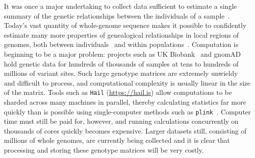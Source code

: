 \documentclass{article}
\begin{document}
It was once a major undertaking to collect data sufficient to estimate a single summary
of the genetic relationships between the individuals of a
sample~\citep[e.g.,][]{Kreitman1983-xr}.
Today's vast quantity of whole-genome sequence
makes it possible to confidently estimate many more properties of genealogical relationships
in local regions of genomes, both between
individuals~\citep[e.g.,][]{browning2010highresolution,aguillon2017deconstructing}
and within
populations~\citep[e.g.,][]{booker2018understanding,haenel2018metaanalysis,stankowski2019widespread}.
Computation is beginning to be a major problem:
projects such as UK Biobank~\citep{bycroft2018genome}
and gnomAD~\citep{karczewski2019variation} hold genetic data for
hundreds of thousands of samples at tens to hundreds of millions of variant sites.
Such large genotype matrices are extremely unwieldy and difficult to process,
and computational complexity is usually linear in the size of the matrix.
Tools such as \texttt{Hail} (\url{https://hail.is}) allow computations to be sharded
across many machines in parallel, thereby calculating statistics far more
quickly than is possible using single-computer methods such as
\texttt{plink}~\citep{purcell2007plink}. Computer time must still be
paid for, however, and running calculations concurrently on thousands of cores quickly
becomes expensive. Larger datasets still, consisting of millions of whole
genomes, are currently being collected and it is clear that processing
and storing these genotype matrices will be very costly.
\end{document}
